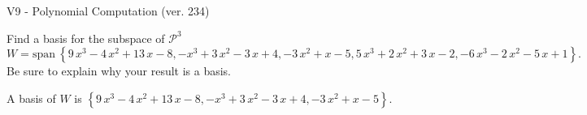 \begin{exercise}
  \begin{exerciseTitle}V9 - Polynomial Computation (ver. 234)\end{exerciseTitle}
  \begin{exerciseStatement}
    Find a basis for the subspace of \(\mathcal{P}^3\) 
\[W=\mathrm{span}\ \left\{9 \, x^{3} - 4 \, x^{2} + 13 \, x - 8 , -x^{3} + 3 \, x^{2} - 3 \, x + 4 , -3 \, x^{2} + x - 5 , 5 \, x^{3} + 2 \, x^{2} + 3 \, x - 2 , -6 \, x^{3} - 2 \, x^{2} - 5 \, x + 1\right\}.\]
 Be sure to explain why your result is a basis.


  \end{exerciseStatement}
  \begin{exerciseAnswer}
   A basis of \(W\) is  \(\left\{9 \, x^{3} - 4 \, x^{2} + 13 \, x - 8 , -x^{3} + 3 \, x^{2} - 3 \, x + 4 , -3 \, x^{2} + x - 5\right\}\).
  


  \end{exerciseAnswer}
\end{exercise}